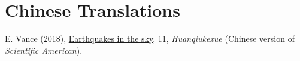 \section{Chinese Translations}

\begin{etaremune}
\item
    E. Vance (2018), \href{https://huanqiukexue.com/a/zazhi/2018/2018/1130/28180.html}{Earthquakes in the sky}, 11,
    \textit{Huanqiukexue} (Chinese version of \textit{Scientific American}).
\end{etaremune}
